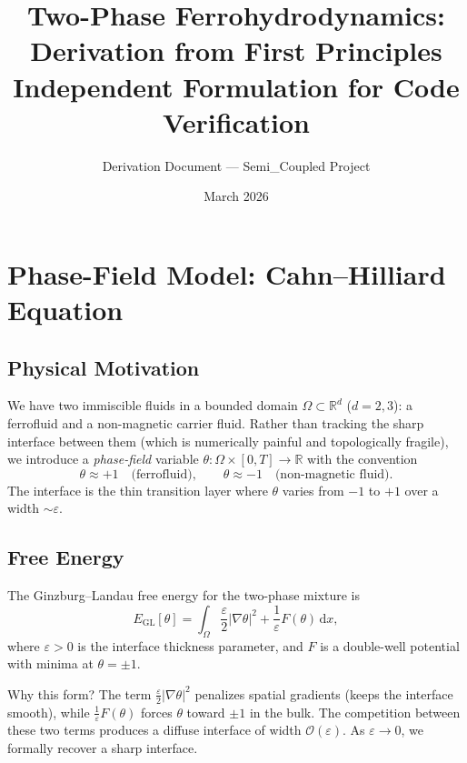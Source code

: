 \documentclass[11pt,a4paper]{article}
\title{%
  Two-Phase Ferrohydrodynamics:\\
  Derivation from First Principles\\[6pt]
  \large Independent Formulation for Code Verification}
\author{Derivation Document — Semi\_Coupled Project}
\date{March 2026}
\theoremstyle{definition}
\theoremstyle{remark}
\newcommand{\R}{\mathbb{R}}
\newcommand{\dd}{\,\mathrm{d}}
\newcommand{\grad}{\nabla}
\newcommand{\eps}{\varepsilon}
\begin{document}
\maketitle
\tableofcontents
\newpage

\section{Phase-Field Model: Cahn--Hilliard Equation}
\label{sec:CH}

\subsection{Physical Motivation}

We have two immiscible fluids in a bounded domain $\Omega \subset \R^d$
($d=2,3$): a ferrofluid and a non-magnetic carrier fluid. Rather than
tracking the sharp interface between them (which is numerically painful
and topologically fragile), we introduce a \emph{phase-field} variable
$\theta : \Omega \times [0,T] \to \R$ with the convention
\[
  \theta \approx +1 \quad \text{(ferrofluid)}, \qquad
  \theta \approx -1 \quad \text{(non-magnetic fluid)}.
\]
The interface is the thin transition layer where $\theta$ varies from
$-1$ to $+1$ over a width $\sim \eps$.

\subsection{Free Energy}

The Ginzburg--Landau free energy for the two-phase mixture is
\begin{equation}
  \label{eq:GL-energy}
  E_{\mathrm{GL}}[\theta]
  = \int_\Omega \frac{\eps}{2} |\grad\theta|^2
    + \frac{1}{\eps} F(\theta) \dd x,
\end{equation}
where $\eps > 0$ is the interface thickness parameter, and $F$ is a
double-well potential with minima at $\theta = \pm 1$.

\begin{derivnote}
Why this form? The term $\frac{\eps}{2}|\grad\theta|^2$ penalizes
spatial gradients (keeps the interface smooth), while
$\frac{1}{\eps}F(\theta)$ forces $\theta$ toward $\pm 1$ in the bulk.
The competition between these two terms produces a diffuse interface of
width $\mathcal{O}(\eps)$. As $\eps \to 0$, we formally recover a sharp
interface.
\end{derivnote}
\end{document}
